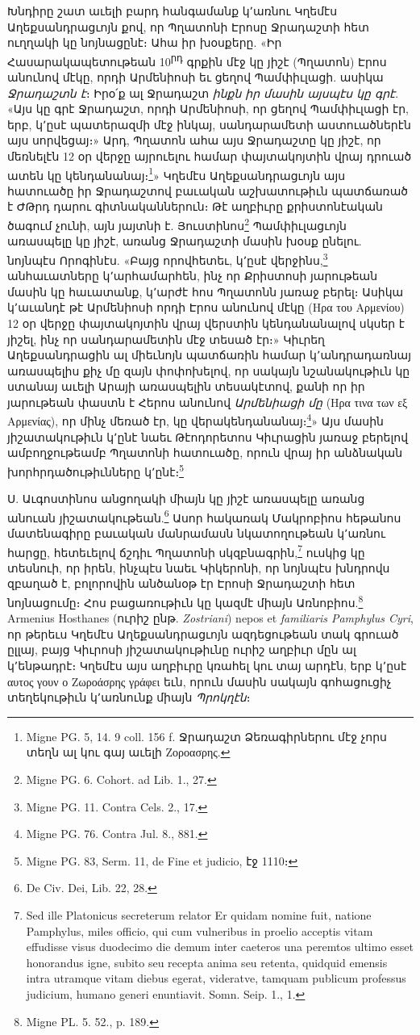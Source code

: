 \documentclass{article}
\begin{document}
{Խնդիրը շատ աւելի բարդ հանգամանք կ՚առնու Կղեմէս Աղեքսանդրացւոյն քով, որ Պղատոնի Էրոսը Ջրադաշտի հետ ուղղակի կը նոյնացընէ։ Ահա իր խօսքերը. «Իր Հասարակապետութեան 10\textsuperscript{րդ} գրքին մէջ կը յիշէ (Պղատոն) Էրոս անունով մէկը, որդի Արմենիոսի եւ ցեղով Պամփիւլացի. ասիկա \emph{Ջրադաշտն է}։ Իրօ՛ք ալ Ջրադաշտ \emph{ինքն իր մասին այսպէս կը գրէ}. «Այս կը գրէ Ջրադաշտ, որդի Արմենիոսի, որ ցեղով Պամփիւլացի էր, երբ, կ՚ըսէ պատերազմի մէջ ինկայ, սանդարամետի աստուածներէն այս սորվեցայ։» Արդ, Պղատոն ահա այս Ջրադաշտը կը յիշէ, որ մեռնելէն 12 օր վերջը այրուելու համար փայտակոյտին վրայ դրուած ատեն կը կենդանանայ։\footnote{Migne PG. 5, 14. 9 coll. 156 f. Ջրադաշտ Ձեռագիրներու մէջ չորս տեղն ալ կու գայ աւելի Ζοροασρης.}» Կղեմէս Աղեքսանդրացւոյն այս հատուածը իր Ջրադաշտով բաւական աշխատութիւն պատճառած է ԺԹրդ դարու գիտնականներուն։ Թէ աղբիւրը քրիստոնէական ծագում չունի, այն յայտնի է. Յուստինոս\footnote{Migne PG. 6. Cohort. ad Lib. 1., 27.} Պամփիւլացւոյն առասպելը կը յիշէ, առանց Ջրադաշտի մասին խօսք ընելու. նոյնպէս Որոգինէս. «Բայց որովհետեւ, կ՚ըսէ վերջինս,\footnote{Migne PG. 11. Contra Cels. 2., 17.} անհաւատները կ՚արհամարհեն, ինչ որ Քրիստոսի յարութեան մասին կը հաւատանք, կ՚արժէ հոս Պղատոնն յառաջ բերել։ Ասիկա կ՚աւանդէ թէ Արմենիոսի որդի Էրոս անունով մէկը (Ηρα του Αρμενίου) 12 օր վերջը փայտակոյտին վրայ վերստին կենդանանալով սկսեր է յիշել, ինչ որ սանդարամետին մէջ տեսած էր։» Կիւրեղ Աղեքսանդրացին ալ միեւնոյն պատճառին համար կ՚անդրադառնայ առասպելիս քիչ մը զայն փոփոխելով, որ սակայն նշանակութիւն կը ստանայ աւելի Արայի առասպելին տեսակէտով, քանի որ իր յարութեան փաստն է Հերոս անունով \emph{Արմենիացի մը} (Ηρα τινα των εξ Αρμενίας), որ մինչ մեռած էր, կը վերակենդանանայ։\footnote{Migne PG. 76. Contra Jul. 8., 881.}» Այս մասին յիշատակութիւն կ՚ընէ նաեւ Թէոդորետոս Կիւրացին յառաջ բերելով ամբողջութեամբ Պղատոնի հատուածը, որուն վրայ իր անձնական խորհրդածութիւնները կ՚ընէ։\footnote{Migne PG. 83, Serm. 11, de Fine et judicio, էջ 1110։}

Ս. Աւգոստինոս անցողակի միայն կը յիշէ առասպելը առանց անուան յիշատակութեան.\footnote{De Civ. Dei, Lib. 22, 28.} Ասոր հակառակ Մակրոբիոս հեթանոս մատենագիրը բաւական մանրամասն նկատողութեան կ՚առնու հարցը, հետեւելով ճշդիւ Պղատոնի սկզբնագրին,\footnote{Sed ille Platonicus secreterum relator Er quidam nomine fuit, natione Pamphylus, miles officio, qui cum vulneribus in proelio acceptis vitam effudisse visus duodecimo die demum inter caeteros una peremtos ultimo esset honorandus igne, subito seu recepta anima seu retenta, quidquid emensis intra utramque vitam diebus egerat, videratve, tamquam publicum professus judicium, humano generi enuntiavit. Somn. Seip. 1., 1.} ուսկից կը տեսնուի, որ իրեն, ինչպէս նաեւ Կիկերոնի, որ նոյնպէս խնդրովս զբաղած է, բոլորովին անծանօթ էր Էրոսի Ջրադաշտի հետ նոյնացումը։ Հոս բացառութիւն կը կազմէ միայն Առնոբիոս.\footnote{Migne PL. 5. 52., p. 189.} Armenius Hosthanes (ուրիշ ընթ. \emph{Zostriani}) nepos et \emph{familiaris Pamphylus Cyri}, որ թերեւս Կղեմէս Աղեքսանդրացւոյն ազդեցութեան տակ գրուած ըլլայ, բայց Կիւրոսի յիշատակութիւնը ուրիշ աղբիւր մըն ալ կ՚ենթադրէ։ Կղեմէս այս աղբիւրը կռահել կու տայ արդէն, երբ կ՚ըսէ αυτος γουν ο Ζωροάσρης γράφει եւն, որուն մասին սակայն գոհացուցիչ տեղեկութիւն կ՚առնունք միայն \emph{Պրոկղէն}։

}
\end{document}
